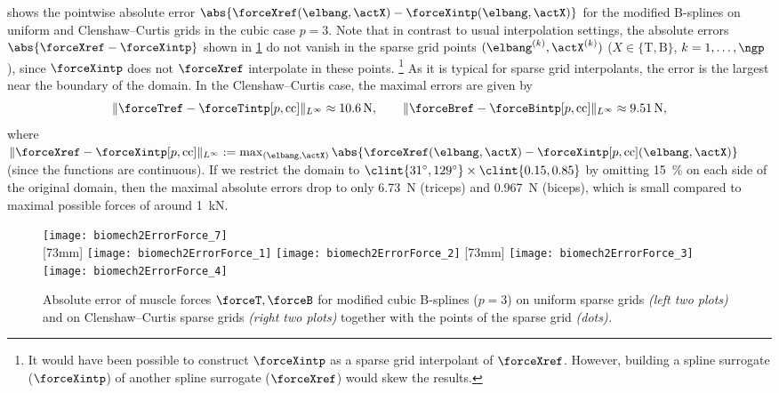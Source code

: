  shows the pointwise absolute error
$\abs{\forceXref(\elbang, \actX) - \forceXintp(\elbang, \actX)}$
for the modified B-splines on uniform and Clenshaw--Curtis grids
in the cubic case $p = 3$.
Note that in contrast to usual interpolation settings,
the absolute errors $\abs{\forceXref - \forceXintp}$
shown in \cref{fig:biomech2ErrorForce} do not vanish in the
sparse grid points $(\elbang^{(k)}, \actX^{(k)})$
($X \in \{\mathrm{T}, \mathrm{B}\}$, $k = 1, \dotsc, \ngp$),
since $\forceXintp$ does not $\forceXref$ interpolate
in these points.%
\footnote{%
  It would have been possible to construct $\forceXintp$
  as a sparse grid interpolant of $\forceXref$.
  However, building a spline surrogate ($\forceXintp$)
  of another spline surrogate ($\forceXref$) would skew the results.%
}
As it is typical for sparse grid interpolants,
the error is the largest near the boundary of the domain.
In the Clenshaw--Curtis case, the maximal errors are given by
\begin{equation}
  \norm[\Linfty]{\forceTref - \forceTintp[p,\cc]}
  \approx \SI{10.6}{\newton},\qquad
  \norm[\Linfty]{\forceBref - \forceBintp[p,\cc]}
  \approx \SI{9.51}{\newton},
\end{equation}
where $\norm[\Linfty]{\forceXref - \forceXintp[p,\cc]}
:= \max_{(\elbang, \actX)}
\abs{\forceXref(\elbang, \actX) - \forceXintp[p,\cc](\elbang, \actX)}$
(since the functions are continuous).
If we restrict the domain to
$\clint{\ang{31}, \ang{129}} \times \clint{0.15, 0.85}$
by omitting \SI{15}{\percent} on each side of the original domain,
then the maximal absolute errors drop to only
\SI{6.73}{\newton} (triceps) and \SI{0.967}{\newton} (biceps),
which is small compared to maximal possible forces of
around \SI{1}{\kilo\newton}.

\begin{figure}
  \texttt{[image: biomech2ErrorForce\_7]}%
  \\[2mm]%
  [73mm]{%
    \texttt{[image: biomech2ErrorForce\_1]}%
    \hfill%
    \texttt{[image: biomech2ErrorForce\_2]}%
  }%
  \hfill%
  [73mm]{%
    \texttt{[image: biomech2ErrorForce\_3]}%
    \hfill%
    \texttt{[image: biomech2ErrorForce\_4]}%
  }%
  \caption[Absolute error of muscle forces]{%
    Absolute error of muscle forces $\forceT, \forceB$ for
    modified cubic B-splines ($p = 3$)
    on uniform sparse grids \emph{(left two plots)} and
    on Clenshaw--Curtis sparse grids \emph{(right two plots)}
    together with the points of the sparse grid \emph{(dots).}%
  }%
  \label{fig:biomech2ErrorForce}%
\end{figure}

